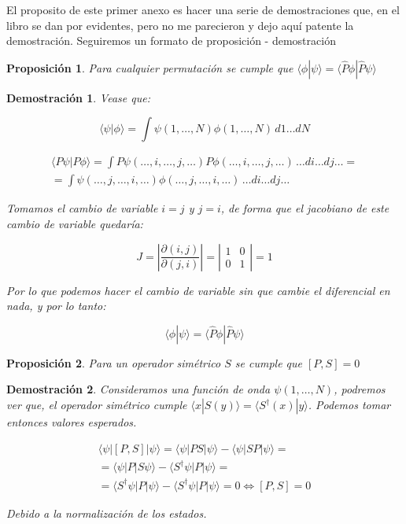 \documentclass{article} %
\newtheorem{dem}{Demostración}[section]
\newtheorem{prop}{Proposición}[section]
\begin{document}
El proposito de este primer anexo es hacer una serie de demostraciones que, en el libro se dan por evidentes, pero no me parecieron y dejo aquí patente la demostración. Seguiremos un formato de proposición - demostración

\begin{prop}
Para cualquier permutación se cumple que $\langle \phi | \psi \rangle = \langle \hat{P} \phi | \hat{P} \psi \rangle$
\label{dem:PermProd}
\end{prop}

\begin{dem}
Vease que:

$$
\langle \psi | \phi \rangle = \int \psi (1, \ldots, N) \phi(1, \ldots, N) \, d1 \ldots dN
$$

\begin{align*}
\langle P \psi | P \phi \rangle = \int P \psi( \ldots, i, \ldots, j, \ldots) P \phi ( \ldots, i, \ldots, j, \ldots) \, \ldots di \ldots dj \ldots = \\ = \int  \psi( \ldots, j, \ldots, i, \ldots)  \phi ( \ldots, j, \ldots, i, \ldots) \, \ldots di \ldots dj \ldots
\end{align*}

Tomamos el cambio de variable $i = j$ y $j = i$, de forma que el jacobiano de este cambio de variable quedaría:

$$
J = \left| \frac{\partial (i, j)}{\partial (j, i)} \right| = \left| \begin{array}{cc}
1 & 0 \\
0 & 1
\end{array} \right| = 1
$$

Por lo que podemos hacer el cambio de variable sin que cambie el diferencial en nada, y por lo tanto:

$$
\langle \phi | \psi \rangle = \langle \hat{P} \phi | \hat{P} \psi \rangle
$$
\end{dem}

\begin{prop}
Para un operador simétrico $S$ se cumple que $[P, S] = 0$
\label{dem:PermCom}
\end{prop}

\begin{dem}
Consideramos una función de onda $\psi ( 1, \ldots, N)$, podremos ver que, el operador simétrico cumple $\langle x | S(y) \rangle = \langle S^{\dagger} (x) | y \rangle$. Podemos tomar entonces valores esperados.

\begin{align*}
\langle \psi | [P, S] | \psi \rangle = \langle \psi | PS | \psi \rangle - \langle \psi | SP | \psi \rangle = \\ = \langle \psi | P | S \psi \rangle - \langle S^{\dagger}\psi | P | \psi \rangle = \\ = \langle S^{\dagger}\psi | P | \psi \rangle - \langle S^{\dagger}\psi | P | \psi \rangle = 0 \iff [P, S] = 0
\end{align*}

Debido a la normalización de los estados.
\end{dem}
\end{document}
